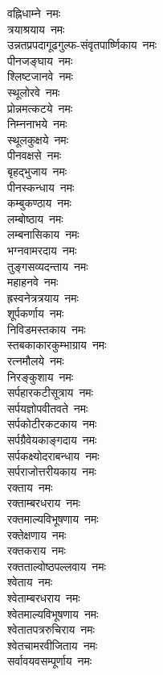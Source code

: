 \begin{multicols}{2}
\begin{flushleft}
वह्निधाम्ने~नमः\\
त्रयाश्रयाय~नमः\\
उन्नतप्रपदागूढगुल्फ-संवृतपार्ष्णिकाय~नमः\\
पीनजङ्घाय~नमः\\
श्लिष्टजानवे~नमः\\
स्थूलोरवे~नमः\\
प्रोन्नमत्कटये~नमः\hfill{}\\
निम्ननाभये~नमः\\
स्थूलकुक्षये~नमः\\
पीनवक्षसे~नमः\\
बृहद्भुजाय~नमः\\
पीनस्कन्धाय~नमः\\
कम्बुकण्ठाय~नमः\\
लम्बोष्ठाय~नमः\\
लम्बनासिकाय~नमः\\
भग्नवामरदाय~नमः\\
तुङ्गसव्यदन्ताय~नमः\hfill{}\\
महाहनवे~नमः\\
ह्रस्वनेत्रत्रयाय~नमः\\
शूर्पकर्णाय~नमः\\
निविडमस्तकाय~नमः\\
स्तबकाकारकुम्भाग्राय~नमः\\
रत्नमौलये~नमः\\
निरङ्कुशाय~नमः\\
सर्पहारकटीसूत्राय~नमः\\
सर्पयज्ञोपवीतवते~नमः\\
सर्पकोटीरकटकाय~नमः\hfill{}\\
सर्पग्रैवेयकाङ्गदाय~नमः\\
सर्पकक्ष्योदराबन्धाय~नमः\\
सर्पराजोत्तरीयकाय~नमः\\
रक्ताय~नमः\\
रक्ताम्बरधराय~नमः\\
रक्तमाल्यविभूषणाय~नमः\\
रक्तेक्षणाय~नमः\\
रक्तकराय~नमः\\
रक्तताल्वोष्ठपल्लवाय~नमः\\
श्वेताय~नमः\hfill{}\\
श्वेताम्बरधराय~नमः\\
श्वेतमाल्यविभूषणाय~नमः\\
श्वेतातपत्ररुचिराय~नमः\\
श्वेतचामरवीजिताय~नमः\\
सर्वावयवसम्पूर्णाय~नमः\\

\end{flushleft}
\end{multicols}
